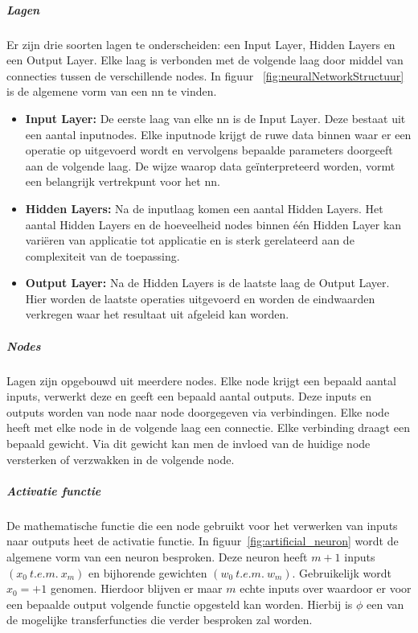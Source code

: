 			\subparagraph{Lagen}
			Er zijn drie soorten lagen te onderscheiden: een Input Layer, Hidden Layers en een Output Layer. Elke laag is verbonden met de volgende laag door middel van connecties tussen de verschillende nodes. In figuur ~\ref{fig:neuralNetworkStructuur} is de algemene vorm van een \gls{nn} te vinden.
		
				\begin{itemize}
					\item \textbf{Input Layer:} De eerste laag van elke \gls{nn} is de Input Layer. Deze bestaat uit een aantal inputnodes. Elke inputnode krijgt de ruwe data binnen waar er een operatie op uitgevoerd wordt en vervolgens bepaalde parameters doorgeeft aan de volgende laag. De wijze waarop data ge\"interpreteerd worden, vormt een belangrijk vertrekpunt voor het \gls{nn}.
					\item \textbf{Hidden Layers:}  Na de inputlaag komen een aantal Hidden Layers. Het aantal Hidden Layers en de hoeveelheid nodes binnen \'e\'en Hidden Layer kan vari\"eren van applicatie tot applicatie en is sterk gerelateerd aan de complexiteit van de toepassing.
					\item \textbf{Output Layer:} Na de Hidden Layers is de laatste laag de Output Layer. Hier worden de laatste operaties uitgevoerd en worden de eindwaarden verkregen waar het resultaat uit afgeleid kan worden.
				\end{itemize}
			
			\subparagraph{Nodes}
			 Lagen zijn opgebouwd uit meerdere nodes. Elke node krijgt een bepaald aantal inputs, verwerkt deze en geeft een bepaald aantal outputs. Deze inputs en outputs worden van node naar node doorgegeven via verbindingen. Elke node heeft met elke node in de volgende laag een connectie. Elke verbinding draagt een bepaald gewicht. Via dit gewicht kan men de invloed van de huidige node versterken of verzwakken in de volgende node.
	
			\subparagraph{Activatie functie}
			De mathematische functie die een node gebruikt voor het verwerken van inputs naar outputs heet de activatie functie. In figuur~\ref{fig:artificial_neuron} wordt de algemene vorm van een neuron besproken. Deze neuron heeft $m+1$ inputs $\left(  x_0 ~t.e.m.~  x_m\right) $ en bijhorende gewichten $\left(  w_0~  t.e.m. ~ w_m \right) $.
			Gebruikelijk wordt $x_0 = +1$ genomen. Hierdoor blijven er maar $m$ echte inputs over waardoor er voor een bepaalde output volgende functie opgesteld kan worden. Hierbij is $\phi$ een van de mogelijke transferfuncties die verder besproken zal worden.

